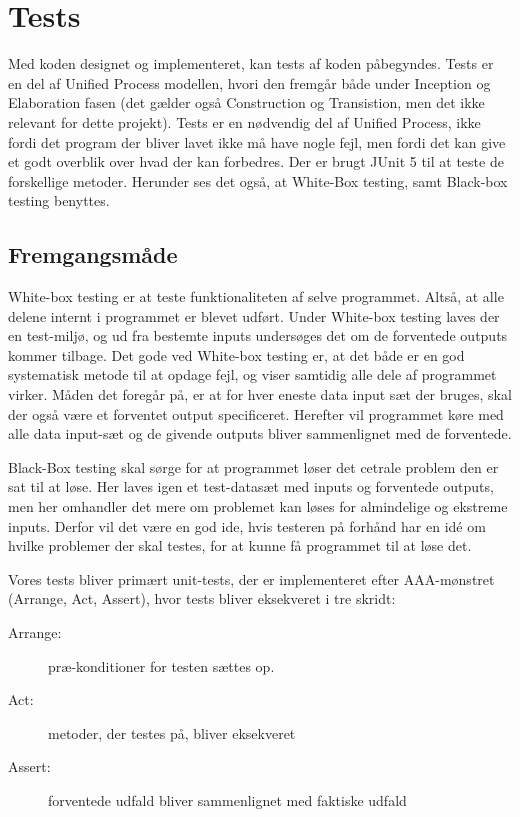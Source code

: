 \chapter{Tests}\label{ch:tests}
Med koden designet og implementeret, kan tests af koden påbegyndes. Tests er en del af Unified Process modellen\cite{UnifiedProcess}, hvori den fremgår både under Inception og Elaboration fasen (det gælder også Construction og Transistion, men det ikke relevant for dette projekt). Tests er en nødvendig del af Unified Process, ikke fordi det program der bliver lavet ikke må have nogle fejl, men fordi det kan give et godt overblik over hvad der kan forbedres\cite{sestoft2008systematic}. Der er brugt JUnit 5\cite{JUnit} til at teste de forskellige metoder. Herunder ses det også, at White-Box testing, samt Black-box testing benyttes. 

\section{Fremgangsmåde}
White-box testing er at teste funktionaliteten af selve programmet. Altså, at alle delene internt i programmet er blevet udført. Under White-box testing laves der en test-miljø, og ud fra bestemte inputs undersøges det om de forventede outputs kommer tilbage. Det gode ved White-box testing er, at det både er en god systematisk metode til at opdage fejl, og viser samtidig alle dele af programmet virker. Måden det foregår på, er at for hver eneste data input sæt der bruges, skal der også være et forventet output specificeret. Herefter vil programmet køre med alle data input-sæt og de givende outputs bliver sammenlignet med de forventede\cite{sestoft2008systematic}.

Black-Box testing skal sørge for at programmet løser det cetrale problem den er sat til at løse. Her laves igen et test-datasæt med inputs og forventede outputs, men her omhandler det mere om problemet kan løses for almindelige og ekstreme inputs. Derfor vil det være en god ide, hvis testeren på forhånd har en idé om hvilke problemer der skal testes, for at kunne få programmet til at løse det\cite{sestoft2008systematic}. 

Vores tests bliver primært unit-tests, der er implementeret efter AAA-mønstret (Arrange, Act, Assert), hvor tests bliver eksekveret i tre skridt\cite{ArrangeActAssert}:
\begin{description}
    \item[Arrange:] præ-konditioner for testen sættes op.
    \item[Act:] metoder, der testes på, bliver eksekveret
    \item[Assert:] forventede udfald bliver sammenlignet med faktiske udfald 
\end{description}

